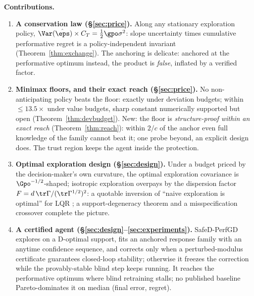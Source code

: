 \documentclass{article}
\begin{document}
\textbf{Contributions.}
\begin{enumerate}\itemsep1pt
\item \textbf{A conservation law (\S\ref{sec:price}).} Along any stationary exploration policy, $\Var(\hat\eps)\times C_T = \tfrac{1}{2}\gpo\sigma^2$: slope uncertainty times cumulative performative regret is a policy-independent invariant (Theorem~\ref{thm:exchange}). The anchoring is delicate: anchored at the performative optimum instead, the product is \emph{false}, inflated by a verified factor.
\item \textbf{Minimax floors, and their exact reach (\S\ref{sec:price}).} No non-anticipating policy beats the floor: exactly under deviation budgets; within $\le 13.5\times$ under value budgets, sharp constant numerically supported but open (Theorem~\ref{thm:devbudget}). New: the floor is \emph{structure-proof within an exact reach} (Theorem~\ref{thm:reach}): within $2/c$ of the anchor even full knowledge of the family cannot beat it; one probe beyond, an explicit design does. The trust region keeps the agent inside the protection.
\item \textbf{Optimal exploration design (\S\ref{sec:design}).} Under a budget priced by the decision-maker's own curvature, the optimal exploration covariance is $\Gpo^{-1/2}$-shaped; isotropic exploration overpays by the dispersion factor $F = d\,\tr\Gamma/(\tr\Gamma^{1/2})^2$: a quotable inversion of ``naive exploration is optimal'' for LQR \citep{simchowitz2020naive}; a support-degeneracy theorem and a misspecification crossover complete the picture.
\item \textbf{A certified agent (\S\ref{sec:design}--\ref{sec:experiments}).} SafeD-PerfGD explores on a D-optimal support, fits an anchored response family with an anytime confidence sequence, and corrects only when a perturbed-modulus certificate guarantees closed-loop stability; otherwise it freezes the correction while the provably-stable blind step keeps running. It reaches the performative optimum where blind retraining stalls; no published baseline Pareto-dominates it on median (final error, regret).
\end{enumerate}
\end{document}
